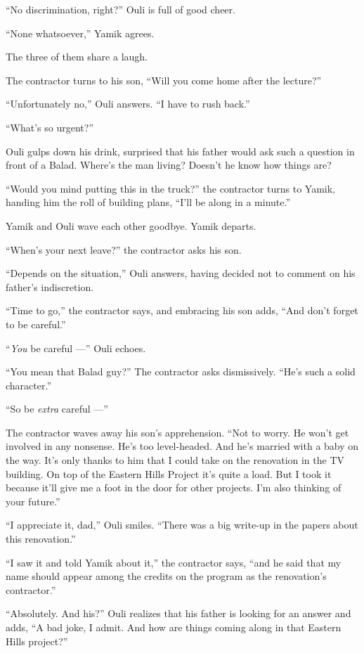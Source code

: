 \documentclass[twoside,11pt,openany]{book}
\begin{document}
``No discrimination, right?'' Ouli is full of good cheer.

``None whatsoever,'' Yamik agrees.

The three of them share a laugh.

The contractor turns to his son, ``Will you come home after the lecture?''

``Unfortunately no,'' Ouli answers. ``I have to rush back.''

``What's so urgent?''

Ouli gulps down his drink, surprised that his father would ask such a question in front of a Balad. Where's the man
living? Doesn't he know how things are?

``Would you mind putting this in the truck?'' the contractor turns to Yamik, handing him the roll of building plans,
``I'll be along in a minute.''

Yamik and Ouli wave each other goodbye. Yamik departs.

``When's your next leave?'' the contractor asks his son.

``Depends on the situation,'' Ouli answers, having decided not to comment on his
father's indiscretion.

``Time to go,'' the contractor says, and embracing his son adds, ``And don't
forget to be careful.''

``\textit{You} be careful ---'' Ouli echoes.

``You mean that Balad guy?'' The contractor asks dismissively. ``He's such a
solid character.''

``So be \textit{extra} careful ---''

The contractor waves away his son's apprehension.  ``Not to worry. He won't get involved in any nonsense.
He's too level-headed. And he's married with a baby on the way. It's only thanks to him that I could take on the
renovation in the TV building. On top of the Eastern Hills Project it's quite a load. But I took it because it'll give
me a foot in the door for other projects. I'm also thinking of your future.''

``I appreciate it, dad,'' Ouli smiles. ``There was a big write-up in the papers
about this renovation.''

``I saw it and told Yamik about it,'' the contractor says, ``and he said that my
name should appear among the credits on the program as the renovation's contractor.''

``Absolutely. And his?'' Ouli realizes that his father is looking for an answer and adds,
``A bad joke, I admit. And how are things coming along in that Eastern Hills project?''
\end{document}
